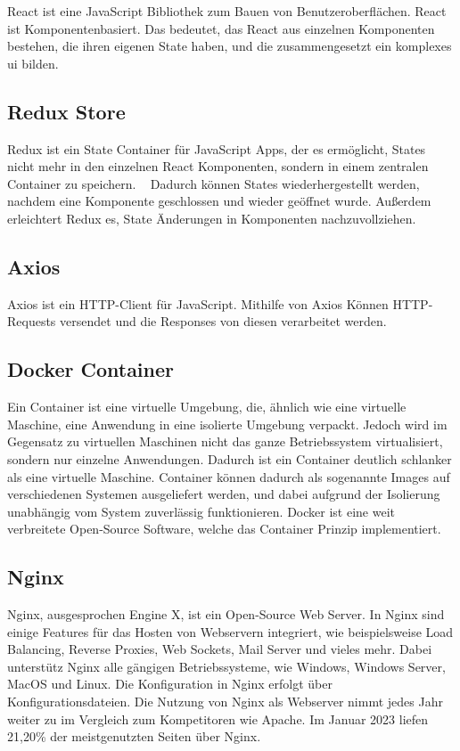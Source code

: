 React ist eine JavaScript Bibliothek zum Bauen von Benutzeroberflächen.
React ist Komponentenbasiert.
Das bedeutet, das React aus einzelnen Komponenten bestehen, die ihren eigenen State haben, und die zusammengesetzt ein komplexes \ac{ui} bilden.
~\autocite{banks:react}


\subsection{Redux Store}
\label{sub:redux}

Redux ist ein State Container für JavaScript Apps, der es ermöglicht, States nicht mehr in den einzelnen React Komponenten, sondern in einem zentralen Container zu speichern.
~\autocite{freecodecamp:redux}
Dadurch können States wiederhergestellt werden, nachdem eine Komponente geschlossen und wieder geöffnet wurde.
Außerdem erleichtert Redux es, State Änderungen in Komponenten nachzuvollziehen.

\subsection{Axios}
\label{sub:axios}

Axios ist ein HTTP-Client für JavaScript.
Mithilfe von Axios Können HTTP-Requests versendet und die Responses von diesen verarbeitet werden.

\subsection{Docker Container}
\label{sub:docker}

Ein Container ist eine virtuelle Umgebung, die, ähnlich wie eine virtuelle Maschine, eine Anwendung in eine isolierte Umgebung verpackt.
Jedoch wird im Gegensatz zu virtuellen Maschinen nicht das ganze Betriebssystem virtualisiert, sondern nur einzelne Anwendungen.
Dadurch ist ein Container deutlich schlanker als eine virtuelle Maschine.
Container können dadurch als sogenannte Images auf verschiedenen Systemen ausgeliefert werden, und dabei aufgrund der Isolierung unabhängig vom System zuverlässig funktionieren.
Docker ist eine weit verbreitete Open-Source Software, welche das Container Prinzip implementiert.
~\autocite{devInsider:container}

\subsection{Nginx}
\label{sub:nginx}

Nginx, ausgesprochen Engine X, ist ein Open-Source Web Server.
In Nginx sind einige Features für das Hosten von Webservern integriert, wie beispielsweise Load Balancing, Reverse Proxies, Web Sockets, Mail Server und vieles mehr.
Dabei unterstütz Nginx alle gängigen Betriebssysteme, wie Windows, Windows Server, MacOS und Linux.
Die Konfiguration in Nginx erfolgt über Konfigurationsdateien.
Die Nutzung von Nginx als Webserver nimmt jedes Jahr weiter zu im Vergleich zum Kompetitoren wie Apache.
Im Januar 2023 liefen 21,20\% der meistgenutzten Seiten über Nginx.
~\autocite{nginx:nginx}

